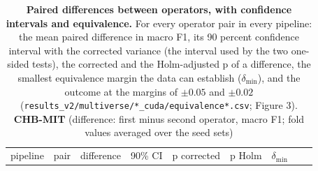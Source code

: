 \documentclass[11pt,a4paper]{article}
\begin{document}
\begin{longtable}[]{@{}
  >{\raggedright\arraybackslash}p{}
  >{\raggedright\arraybackslash}p{}
  >{\raggedright\arraybackslash}p{}
  >{\raggedright\arraybackslash}p{}
  >{\raggedright\arraybackslash}p{}
  >{\raggedright\arraybackslash}p{}
  >{\raggedright\arraybackslash}p{}
  >{\raggedright\arraybackslash}p{}
  >{\raggedright\arraybackslash}p{}@{}}
\caption{\textbf{Paired differences between operators, with confidence intervals and equivalence.} For every operator pair in every pipeline: the mean paired difference in macro F1, its 90 percent confidence interval with the corrected variance (the interval used by the two one-sided tests), the corrected and the Holm-adjusted p of a difference, the smallest equivalence margin the data can establish (\(\delta_{\min}\)), and the outcome at the margins of \(\pm 0.05\) and \(\pm 0.02\) (\nolinkurl{results_v2/multiverse/*_cuda/equivalence*.csv}; Figure 3). \textbf{CHB-MIT} (difference: first minus second operator, macro F1; fold values averaged over the seed sets)}\tabularnewline
\toprule\noalign{}
\begin{minipage}[b]{\linewidth}\raggedright
pipeline
\end{minipage} & \begin{minipage}[b]{\linewidth}\raggedright
pair
\end{minipage} & \begin{minipage}[b]{\linewidth}\raggedright
difference
\end{minipage} & \begin{minipage}[b]{\linewidth}\raggedright
90\% CI
\end{minipage} & \begin{minipage}[b]{\linewidth}\raggedright
p corrected
\end{minipage} & \begin{minipage}[b]{\linewidth}\raggedright
p Holm
\end{minipage} & \begin{minipage}[b]{\linewidth}\raggedright
\(\delta_{\min}\)
\end{minipage} & \begin{minipage}[b]{\linewidth}\raggedright

\end{minipage}
\end{longtable}
\end{document}
